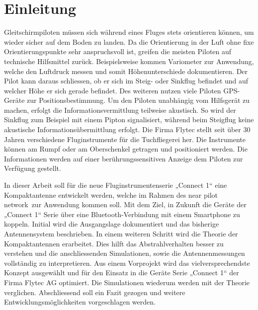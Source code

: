 \newpage
\section{Einleitung}
Gleitschirmpiloten müssen sich während eines Fluges stets orientieren können, um wieder sicher auf dem Boden zu landen. Da die Orientierung in der Luft ohne fixe Orientierungspunkte sehr anspruchsvoll ist, greifen die meisten Piloten auf technische Hilfsmittel zurück. Beispielsweise kommen Variometer zur Anwendung, welche den Luftdruck messen und somit Höhenunterschiede dokumentieren. Der Pilot kann daraus schliessen, ob er sich im Steig- oder Sinkflug befindet und auf welcher Höhe er sich gerade befindet. Des weiteren nutzen viele Piloten GPS-Geräte zur Positionsbestimmung. Um den Piloten unabhängig vom Hilfsgerät zu machen, erfolgt die Informationsvermittlung teilweise akustisch. So wird der Sinkflug zum Beispiel mit einem Pipton signalisiert, während beim Steigflug keine akustische Informationsübermittlung erfolgt. Die Firma Flytec stellt seit über 30 Jahren verschiedene Fluginstrumente für die Tuchfliegerei her. Die Instrumente können am Rumpf oder am Oberschenkel getragen und positioniert werden. Die Informationen werden auf einer berührungssensitiven Anzeige dem Piloten zur Verfügung gestellt. 

In dieser Arbeit soll für die neue Fluginstrumentenserie „Connect 1“ eine Kompaktantenne entwickelt werden, welche im Rahmen des \glqq near pilot network\grqq \ zur Anwendung kommen soll. Mit dem Ziel, in Zukunft die Geräte der „Connect 1“ Serie über eine Bluetooth-Verbindung mit einem Smartphone zu koppeln. Initial wird die Ausgangslage dokumentiert und das bisherige Antennensystem beschrieben. In einem weiteren Schritt wird die Theorie der Kompaktantennen erarbeitet. Dies hilft   das Abstrahlverhalten besser zu verstehen und die anschliessenden Simulationen, sowie die Antennenmessungen vollständig zu interpretieren. Aus einem Vorprojekt wird das vielversprechendste Konzept ausgewählt und für den Einsatz in die Geräte Serie „Connect 1“ der Firma Flytec AG optimiert. Die Simulationen wiederum werden mit der Theorie verglichen. Abschliessend soll ein Fazit gezogen und weitere Entwicklungsmöglichkeiten vorgeschlagen werden.


